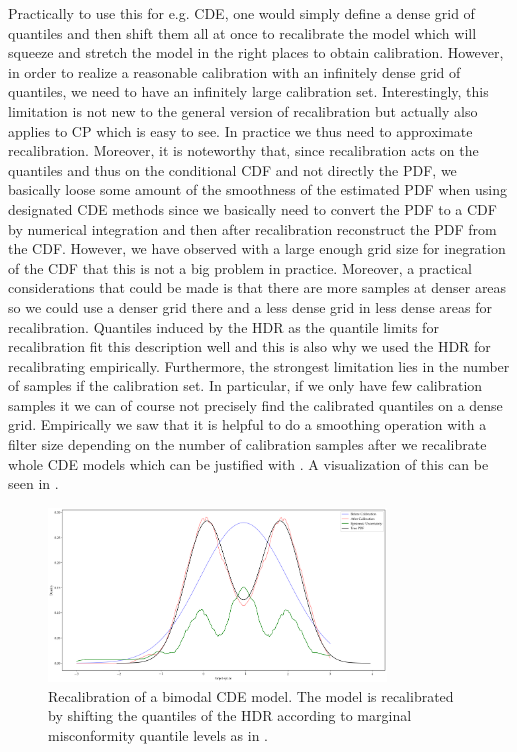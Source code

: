 Practically to use this for e.g. CDE, one would simply define a dense grid of quantiles and then shift them all at once to recalibrate the model which will squeeze and stretch the model in the right places to obtain calibration. However, in order to realize a reasonable calibration with an infinitely dense grid of quantiles, we need to have an infinitely large calibration set. Interestingly, this limitation is not new to the general version of recalibration but actually also applies to CP which is easy to see. In practice we thus need to approximate recalibration. Moreover, it is noteworthy that, since recalibration acts on the quantiles and thus on the conditional CDF and not directly the PDF, we basically loose some amount of the smoothness of the estimated PDF when using designated CDE methods since we basically need to convert the PDF to a CDF by numerical integration and then after recalibration reconstruct the PDF from the CDF. However, we have observed with a large enough grid size for inegration of the CDF that this is not a big problem in practice. Moreover, a practical considerations that could be made is that there are more samples at denser areas so we could use a denser grid there and a less dense grid in less dense areas for recalibration. Quantiles induced by the HDR as the quantile limits for recalibration fit this description well and this is also why we used the HDR for recalibrating empirically. Furthermore, the strongest limitation lies in the number of samples if the calibration set. In particular, if we only have few calibration samples it we can of course not precisely find the calibrated quantiles on a dense grid. Empirically we saw that it is helpful to do a smoothing operation with a filter size depending on the number of calibration samples after we recalibrate whole CDE models which can be justified with . A visualization of this can be seen in .

\begin{figure}
    \centering
    \includegraphics[width=0.8\textwidth]{resources/recalibration_bimodal_cde.png}
    \caption{Recalibration of a bimodal CDE model. The model is recalibrated by shifting the quantiles of the HDR according to marginal misconformity quantile levels as in .}
    \label{fig:recalibration}
\end{figure}

